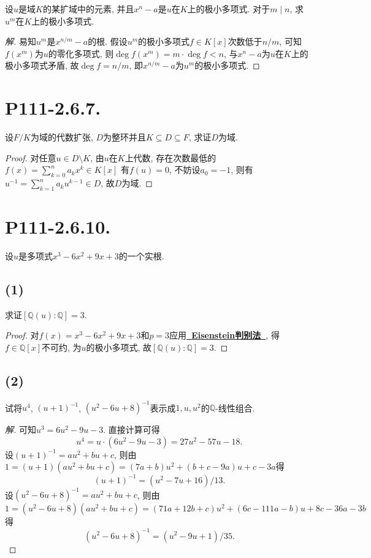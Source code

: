 \documentclass[12pt, a4paper, fontset=windows]{ctexart}
\newcommand{\Q}{\mathbb{Q}}
\newcommand{\myref}[2][]{\hyperref[#1]{\bf\color{blue}\ {#2}\ }}
\def\pmat#1{\begin{pmatrix}#1\end{pmatrix}}
\newenvironment{solution}{\begin{proof}[解]}{\end{proof}}
\begin{document}
设$u$是域$K$的某扩域中的元素, 并且$x^n-a$是$u$在$K$上的极小多项式. 
对于$m\mid n$, 求$u^m$在$K$上的极小多项式. 

\begin{solution}
易知$u^m$是$x^{n/m}-a$的根. 假设$u^m$的极小多项式$f\in K[x]$次数低于$n/m$, 
可知$f(x^m)$为$u$的零化多项式, 则$\deg f(x^m)=m\cdot\deg f<n$, 
与$x^n-a$为$u$在$K$上的极小多项式矛盾, 
故$\deg f=n/m$, 即$x^{n/m}-a$为$u^m$的极小多项式. 
\end{solution}

\section*{P111-2.6.7.}

设$F/K$为域的代数扩张, $D$为整环并且$K\subseteq D\subseteq F$, 求证$D$为域. 

\begin{proof}
对任意$u\in D\setminus K$, 由$u$在$K$上代数, 存在次数最低的$f(x)=\sum^n_{k=0}a_kx^k\in K[x]$
有$f(u)=0$, 不妨设$a_0=-1$, 则有$u^{-1}=\sum^n_{k=1}a_ku^{k-1}\in D$, 故$D$为域. 
\end{proof}

\section*{P111-2.6.10.}

设$u$是多项式$x^3-6x^2+9x+3$的一个实根. 

\subsection*{(1)}

求证$[\Q(u):\Q]=3$. 

\begin{proof}
对$f(x)=x^3-6x^2+9x+3$和$p=3$应用\myref[eisenstein]{Eisenstein判别法}, 
得$f\in\Q[x]$不可约, 为$u$的极小多项式, 故$[\Q(u):\Q]=3$. 
\end{proof}

\subsection*{(2)}

试将$u^4$, $(u+1)^{-1}$, $(u^2-6u+8)^{-1}$表示成$1,u,u^2$的$\Q$-线性组合. 

\begin{solution}
可知$u^3=6u^2-9u-3$. 直接计算可得
\[u^4=u\cdot(6u^2-9u-3)=27u^2-57u-18.\]
设$(u+1)^{-1}=au^2+bu+c$, 则由
$1=(u+1)(au^2+bu+c)=(7a+b)u^2+(b+c-9a)u+c-3a$得
\[(u+1)^{-1}=(u^2-7u+16)/13.\]
设$(u^2-6u+8)^{-1}=au^2+bu+c$, 则由
$1=(u^2-6u+8)(au^2+bu+c)=(71a+12b+c)u^2+(6c-111a-b)u+8c-36a-3b$得
\[(u^2-6u+8)^{-1}=(u^2-9u+1)/35.\]
\end{solution}
\end{document}
